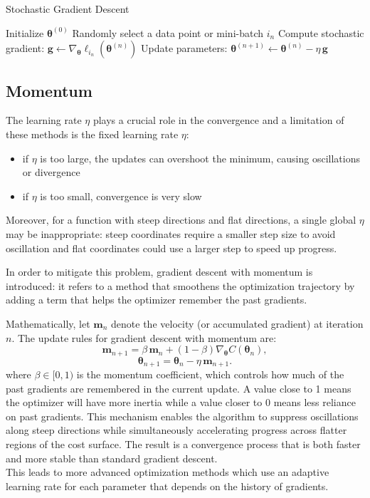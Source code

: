 \documentclass[
 reprint,            %
 amsmath,amssymb,
 aps,
]{revtex4-2}
\begin{document}
\begin{algorithm}[H]
\caption{Stochastic Gradient Descent}
\begin{algorithmic}[1]
\State Initialize $\boldsymbol{\theta}^{(0)}$
    \State Randomly select a data point or mini-batch $i_n$
    \State Compute stochastic gradient: $\mathbf{g} \gets \nabla_{\boldsymbol{\theta}} \ell_{i_n}(\boldsymbol{\theta}^{(n)})$
    \State Update parameters: $\boldsymbol{\theta}^{(n+1)} \gets \boldsymbol{\theta}^{(n)} - \eta \, \mathbf{g}$
\EndFor
\end{algorithmic}
\end{algorithm}

\subsection{Momentum}

The learning rate $\eta$ plays a crucial role in the convergence and a limitation of these methods is the fixed learning rate ${\eta}$: 
\begin{itemize}
    \item if $\eta$ is too large, the updates can overshoot the minimum, causing oscillations or divergence
    \item if $\eta$ is too small, convergence is very slow
\end{itemize}
Moreover, for a function with steep directions and flat directions, a single global $ \eta$ may be inappropriate:
steep coordinates require a smaller step size to avoid oscillation and flat coordinates could use a larger step to speed up progress.

In order to mitigate this problem, gradient descent with momentum is introduced: it refers to a method that smoothens the optimization trajectory by adding a term that helps the optimizer remember the past gradients\cite{hjorthjensen_week37}.

Mathematically, let $\boldsymbol{m}_n$ denote the velocity (or accumulated gradient) at iteration $n$. The update rules for gradient descent with momentum are:
\[
\boldsymbol{m}_{n+1} = \beta \, \boldsymbol{m}_n + (1-\beta)\nabla_{\boldsymbol{\theta}} C(\boldsymbol{\theta}_n),
\]
\[
\boldsymbol{\theta}_{n+1} = \boldsymbol{\theta}_n - \eta \, \boldsymbol{m}_{n+1}.
\]
where $\beta \in [0,1)$ is the momentum coefficient, which controls how much of the past gradients are remembered in the current update. A value close to 1 means the optimizer will have more inertia while a value closer to 0 means less reliance on past gradients. This mechanism enables the algorithm to suppress oscillations along steep directions while simultaneously accelerating progress across flatter regions of the cost surface. The result is a convergence process that is both faster and more stable than standard gradient descent.\\
This leads to more advanced optimization methods which use an adaptive learning rate for each parameter that depends on the history of gradients.\cite{hjorthjensen_week37}\\
\end{document}
